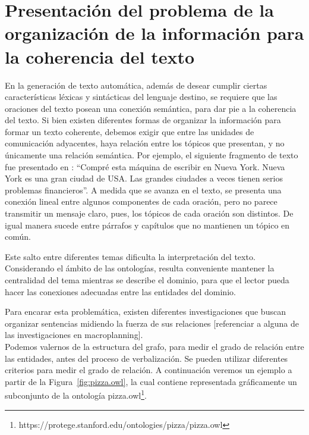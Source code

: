 \section{Presentación del problema de la organización de la información para la coherencia del texto}
\label{sec:problema_coherencia-texto}
 En la generación de texto automática, además de desear cumplir ciertas características léxicas y sintácticas del lenguaje destino, se requiere que las oraciones del texto posean una conexión semántica, para dar pie a la coherencia del texto. 
Si bien existen diferentes formas de organizar la información para formar un texto coherente, debemos exigir que entre las unidades de comunicación adyacentes, haya relación entre los tópicos que presentan, y no únicamente una relación semántica. Por ejemplo, el siguiente fragmento de texto fue presentado en \cite{van1983ciencia}:
``Compré esta máquina de escribir en Nueva York. Nueva York es una gran ciudad de USA. Las grandes ciudades a veces tienen serios problemas financieros''. A medida que se avanza en el texto, se presenta una conexión lineal entre algunos componentes de cada oración, pero no parece transmitir un mensaje claro, pues, los tópicos de cada oración son distintos. De igual manera sucede entre párrafos y capítulos que no mantienen un tópico en común. 

Este salto entre diferentes temas dificulta la interpretación del texto. Considerando el ámbito de las ontologías, resulta conveniente mantener la centralidad del tema mientras se describe el dominio, para que el lector pueda hacer las conexiones adecuadas entre las entidades del dominio.

Para encarar esta problemática, existen diferentes investigaciones que buscan organizar sentencias midiendo la fuerza de sus relaciones [referenciar a alguna de las investigaciones en macroplanning]. 
\\
Podemos valernos de la estructura del grafo, para medir el grado de relación entre las entidades, antes del proceso de verbalización. Se pueden utilizar diferentes criterios para medir el grado de relación. A continuación veremos un ejemplo a partir de la Figura~\ref{fig:pizza.owl}, la cual contiene representada gráficamente un subconjunto de la ontología pizza.owl\footnote{https://protege.stanford.edu/ontologies/pizza/pizza.owl}.

